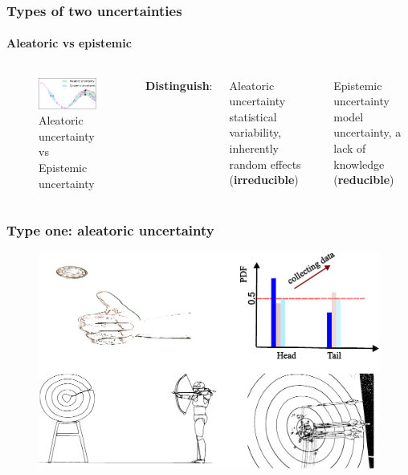 \begin{frame}
\frametitle{Types of two uncertainties}
\framesubtitle{Aleatoric vs epistemic}

\begin{columns}
        \begin{figure}
        \centering
            \includegraphics[width = 9cm]{figures/aleatoricvsepisidemic.pdf}
            \caption{Aleatoric uncertainty vs Epistemic uncertainty}
        \end{figure} 
     \textbf{Distinguish}:
     \begin{block}{Aleatoric uncertainty}
statistical variability, inherently random effects (\textbf{irreducible})
     \end{block}
     \begin{block}{Epistemic uncertainty}
model uncertainty, a lack of knowledge (\textbf{reducible})
     \end{block}    
    \end{columns}
\end{frame}



\begin{frame}
\frametitle{Type one: aleatoric uncertainty}
 \centering
  \begin{figure}
    \includegraphics[scale=0.65]{figures/figure-coin_shooting.pdf}
\end{figure}
\end{frame}

